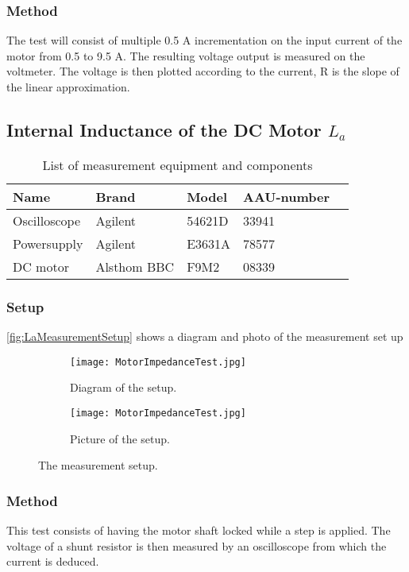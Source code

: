 \subsubsection*{Method}
The test will consist of multiple 0.5 A incrementation on the input current of the motor from 0.5 to 9.5 A. The resulting voltage output is measured on the voltmeter. The voltage is then plotted according to the current, R is the slope of the linear approximation.

\subsection{Internal Inductance of the DC Motor $L_a$}
\begin{table}[htbp]
	\centering
	\caption{List of measurement equipment and components}\label{tab_appendix:LaSetUp}

	\begin{tabularx}{\textwidth}{lXXXX}
		Name 				& Brand	& Model & AAU-number									\\ \toprule \rowcolor{lightGrey}
		Oscilloscope	& Agilent & 54621D & 33941 	\\
		Powersupply	& Agilent & E3631A & 78577\\ \rowcolor{lightGrey}
		DC motor & Alsthom BBC & F9M2& 08339
	\end{tabularx}
\end{table}
\subsubsection*{Setup}
\autoref{fig:LaMeasurementSetup} shows a diagram and photo of the measurement set up
\begin{figure}[htbp]
	\centering
	\begin{subfigure}{0.50\textwidth}
		\texttt{[image: MotorImpedanceTest.jpg]}
		\caption{Diagram of the setup.} \label{fig:LaMeasurementDiagram}
	\end{subfigure}
	\begin{subfigure}{0.40\textwidth}
		\texttt{[image: MotorImpedanceTest.jpg]}
		\caption{Picture of the setup.} \label{fig:LaMeasurementPictures}
	\end{subfigure}
	\caption{The measurement setup.} \label{fig:LaMeasurementSetup}   
\end{figure}

\subsubsection*{Method}
This test consists of having the motor shaft locked while a step is applied. The voltage of a shunt resistor is then measured by an oscilloscope from which the current is deduced.

